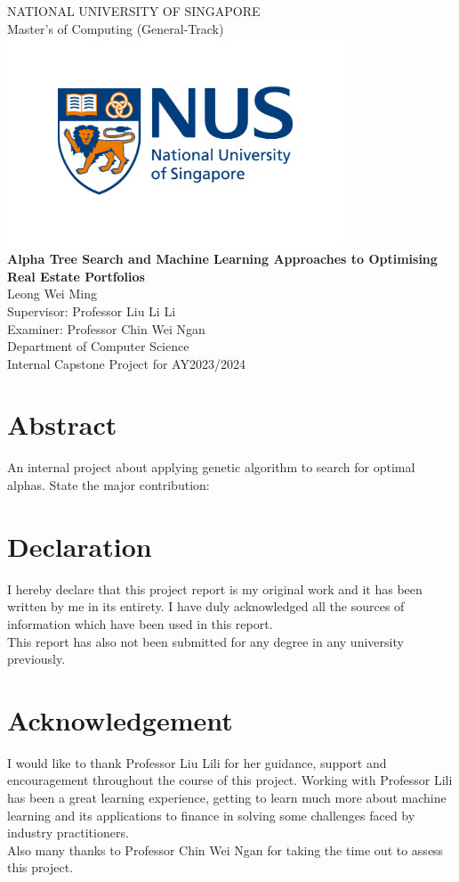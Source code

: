 \documentclass[a4paper,12pt]{report}
\numberwithin{equation}{section}
\theoremstyle{definition}
\begin{document}
\begin{center}

\Large NATIONAL UNIVERSITY OF SINGAPORE\\ 
\Large Master's of Computing (General-Track) \\ [0.2in]
\includegraphics[width=10cm]{1.nus_logo_full-horizontal} \\
\Large {\bf Alpha Tree Search and Machine Learning Approaches to Optimising Real Estate Portfolios}\\ [0.2in]
Leong Wei Ming \\
Supervisor: Professor Liu Li Li \\
Examiner: Professor Chin Wei Ngan \\ [0.3in]
Department of Computer Science \\
Internal Capstone Project for AY2023/2024
\end{center}

\chapter*{Abstract}
An internal project about applying genetic algorithm to search for optimal alphas.    
State the major contribution:

\chapter*{Declaration}
\begin{center}{\large
I hereby declare that this project report is my original work and it has been written by me in its entirety. I have duly acknowledged all the sources of information which have been used in this report. \\[0.5in]
This report has also not been submitted for any degree in any university previously.
}

\chapter*{Acknowledgement}
{\large
I would like to thank Professor Liu Lili for her guidance, support and encouragement throughout the course of this project. Working with Professor Lili has been a great learning experience, getting to learn much more about machine learning and its applications to finance in solving some challenges faced by industry practitioners. \\[0.5in]
Also many thanks to Professor Chin Wei Ngan for taking the time out to assess this project.

}
\end{center}
\setcounter{secnumdepth}{3}
\setcounter{tocdepth}{3}
\end{document}
